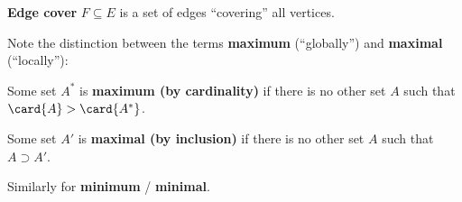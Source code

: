 \documentclass[a4paper,12pt]{article}
\begin{document}
\begin{terms}
    \item \textbf{Edge cover} $F \subseteq E$ is a set of edges \enquote{covering} all vertices.

    \item Note the distinction between the terms \textbf{maximum} (\enquote{globally}) and \textbf{maximal} (\enquote{locally}):
    \begin{terms}
        \newcommand{\MySet}{A}

        \item Some set $\MySet^{*}$ is \textbf{maximum (by cardinality)} if there is no other set $\MySet$ such that $\card{\MySet} > \card{\MySet^{*}}$.

        \item Some set $\MySet'$ is \textbf{maximal (by inclusion)} if there is no other set $\MySet$ such that $\MySet \supset \MySet'$.

        \item Similarly for \textbf{minimum} / \textbf{minimal}.
    \end{terms}
\end{terms}

\fi
\end{document}
